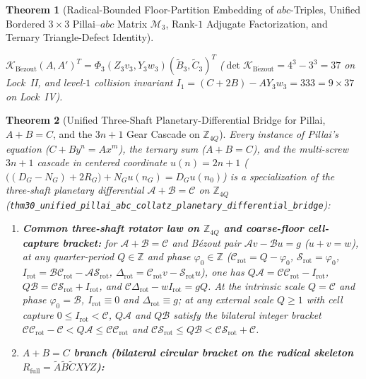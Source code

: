 \documentclass[11pt,a4paper]{article}
\theoremstyle{plain}
\newtheorem{theorem}{Theorem}[section]
\theoremstyle{definition}
\begin{document}
\begin{theorem}[Radical-Bounded Floor-Partition Embedding of $abc$-Triples, Unified Bordered $3\times 3$ Pillai--$abc$ Matrix $\mathcal{M}_3$, Rank-$1$ Adjugate Factorization, and Ternary Triangle-Defect Identity]
\begin{enumerate}[label=\textbf{(\roman*)},leftmargin=*]
$\mathcal{K}_{\mathrm{B\acute{e}zout}}(A,A')^T = \Phi_3(Z_3 v_3, Y_3 w_3)(\widetilde{B}_3,\widetilde{C}_3)^T$ ($\det\mathcal{K}_{\mathrm{B\acute{e}zout}} = 4^3-3^3 = 37$ on Lock~II, and level-$1$ collision invariant $I_1 = (C+2B)-A Y_3 w_3 = 333 = 9\times 37$ on Lock~IV).
\end{enumerate}
\end{theorem}

\begin{theorem}[Unified Three-Shaft Planetary-Differential Bridge for Pillai, $A+B=C$, and the $3n+1$ Gear Cascade on $\mathbb{Z}_{4Q}$]
\label{thm:main-30}
Every instance of Pillai's equation ($C + B y^n = A x^m$), the ternary sum ($A + B = C$), and the multi-screw $3n+1$ cascade in centered coordinate $u(n) = 2n+1$ ($\bigl((D_G - N_G) + 2R_G\bigr) + N_G u(n_G) = D_G u(n_0)$) is a specialization of the three-shaft planetary differential $\mathcal{A} + \mathcal{B} = \mathcal{C}$ on $\mathbb{Z}_{4Q}$ (\texttt{thm30\_unified\_pillai\_abc\_collatz\_planetary\_differential\_bridge}):
\begin{enumerate}[label=\textbf{(\roman*)},leftmargin=*]
\item \textbf{Common three-shaft rotator law on $\mathbb{Z}_{4Q}$ and coarse-floor cell-capture bracket:}
  for $\mathcal{A} + \mathcal{B} = \mathcal{C}$ and B\'ezout pair $\mathcal{A}v - \mathcal{B}u = g$ ($u+v=w$), at any quarter-period $Q\in\mathbb{Z}$ and phase $\varphi_0\in\mathbb{Z}$ ($\mathcal{C}_{\mathrm{rot}} = Q-\varphi_0$, $\mathcal{S}_{\mathrm{rot}} = \varphi_0$, $I_{\mathrm{rot}} = \mathcal{B}\mathcal{C}_{\mathrm{rot}} - \mathcal{A}\mathcal{S}_{\mathrm{rot}}$, $\Delta_{\mathrm{rot}} = \mathcal{C}_{\mathrm{rot}}v - \mathcal{S}_{\mathrm{rot}}u$), one has $Q\mathcal{A} = \mathcal{C}\mathcal{C}_{\mathrm{rot}} - I_{\mathrm{rot}}$, $Q\mathcal{B} = \mathcal{C}\mathcal{S}_{\mathrm{rot}} + I_{\mathrm{rot}}$, and $\mathcal{C}\Delta_{\mathrm{rot}} - w I_{\mathrm{rot}} = g Q$. At the intrinsic scale $Q = \mathcal{C}$ and phase $\varphi_0 = \mathcal{B}$, $I_{\mathrm{rot}} \equiv 0$ and $\Delta_{\mathrm{rot}} \equiv g$; at any external scale $Q\ge 1$ with cell capture $0 \le I_{\mathrm{rot}} < \mathcal{C}$, $Q\mathcal{A}$ and $Q\mathcal{B}$ satisfy the bilateral integer bracket $\mathcal{C}\mathcal{C}_{\mathrm{rot}} - \mathcal{C} < Q\mathcal{A} \le \mathcal{C}\mathcal{C}_{\mathrm{rot}}$ and $\mathcal{C}\mathcal{S}_{\mathrm{rot}} \le Q\mathcal{B} < \mathcal{C}\mathcal{S}_{\mathrm{rot}} + \mathcal{C}$.
\item \textbf{$A+B=C$ branch (bilateral circular bracket on the radical skeleton $R_{\mathrm{full}} = \widetilde{A}\widetilde{B}\widetilde{C}XYZ$):}

\end{enumerate}
\end{theorem}
\end{document}
